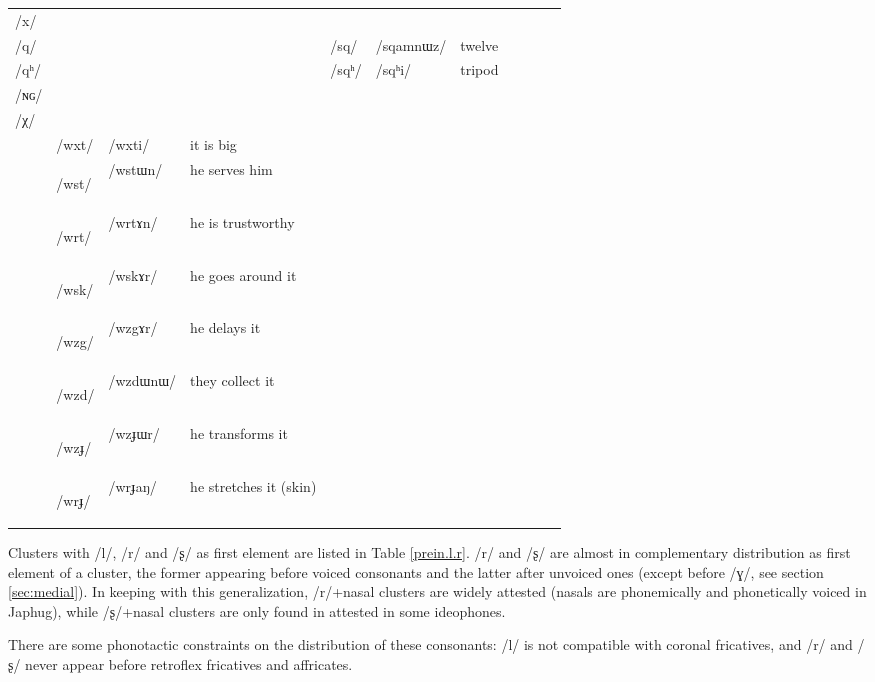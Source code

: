 \documentclass[oneside,a4paper,11pt]{article}
\newcommand{\ipa}[1]{\mbox{\phon/#1/}}
\newcommand{\deux}[1]{\ipa{#1}\addtocounter{2clusters}{1}}
\newcommand{\trois}[1]{\ipa{#1}\addtocounter{3clusters}{1}}
\newcommand{\tib}[1]{\cellcolor{lightgray}\textbf{#1}}
\newcommand{\resetcounters}[2]{
\newcounter{#1}
\newcounter{#2}
 \setcounter{#1}{\value{2clusters}}
  \setcounter{#2}{\value{3clusters}}
 \setcounter{2clusters}{0}
  \setcounter{3clusters}{0}
}
\begin{document}
\begin{landscape}
\begin{table}
\begin{tabular}{l|lll|lll|lll|l}
\ipa{x}  &	  &	  &	&	  &	  &	&	  &	  &	&	\\
\ipa{q}  &	  &	  &	&	\deux{sq}  &	\ipa{sqamnɯz}  &	twelve&	  &	  &	&	\\
\ipa{qʰ}  &	  &	  &	&	\deux{sqʰ}  &	\ipa{sqʰi}  &	tripod&	  &	  &	&	\\
\ipa{ɴɢ}  &	  &	  &	&	  &	  &	&	  &	  &	&	\\
\ipa{χ}  &	  &	  &	&	  &	  &	&	  &	  &	&	\\
\midrule
&	\trois{wxt}  &	\ipa{wxti}  &it is big	\\
&	\trois{wst} \tib{} &	\ipa{wstɯn}  &he serves him	\\
&	\trois{wrt}  \tib{} &	\ipa{wrtɤn}  &	he is trustworthy\\
&	\trois{wsk}  \tib{} &	\ipa{wskɤr}  & he goes around it	\\
&	\trois{wzg}  \tib{} &	\ipa{wzgɤr}  & he delays it	\\
&	\trois{wzd}  \tib{} &	\ipa{wzdɯnɯ}  & they collect it	\\
&	\trois{wzɟ}  \tib{} &	\ipa{wzɟɯr}  & he transforms it	\\
&	\trois{wrɟ}  \tib{} &	\ipa{wrɟaŋ}  &he stretches it (skin)	\\
\bottomrule
\end{tabular}%
\end{table}
 \end{landscape}
\resetcounters{2wszC}{3wszC} %
 Clusters with \ipa{l}, \ipa{r}  and \ipa{ʂ} as first element are listed in Table \ref{prein.l.r}. \ipa{r} and \ipa{ʂ} are almost in complementary distribution as first element of a cluster, the former appearing before voiced consonants and the latter after unvoiced ones (except before \ipa{ɣ}, see section \ref{sec:medial}). In keeping with this generalization, \ipa{r}+nasal clusters are widely attested (nasals are phonemically and phonetically voiced in Japhug),  while \ipa{ʂ}+nasal clusters are only found in attested in some ideophones.
 
 There are some phonotactic constraints on the distribution of these consonants: \ipa{l} is not compatible with coronal fricatives,  and \ipa{r} and \ipa{ʂ} never appear before retroflex fricatives and affricates.  
 
\end{document}
